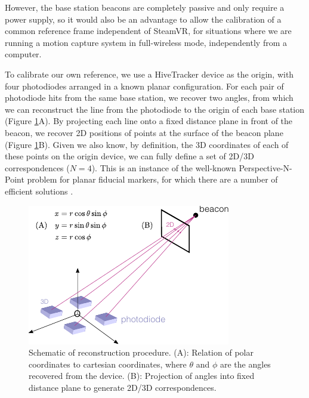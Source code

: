 \documentclass[sigchi]{acmart}
\begin{document}
However, the base station beacons are completely passive and only require a power supply, so it would also be an advantage to allow the calibration of a common reference frame independent of SteamVR, for situations where we are running a motion capture system in full-wireless mode, independently from a computer.

To calibrate our own reference, we use a HiveTracker device as the origin, with four photodiodes arranged in a known planar configuration. For each pair of photodiode hits from the same base station, we recover two angles, from which we can reconstruct the line from the photodiode to the origin of each base station (Figure \ref{Fig:Reconstruction}A). By projecting each line onto a fixed distance plane in front of the beacon, we recover 2D positions of points at the surface of the beacon plane (Figure \ref{Fig:Reconstruction}B). Given we also know, by definition, the 3D coordinates of each of these points on the origin device, we can fully define a set of 2D/3D correspondences ($N = 4$). This is an instance of the well-known Perspective-N-Point problem for planar fiducial markers, for which there are a number of efficient solutions \cite{Lepetit2008,Garrido-Jurado2014}.

\begin{figure}[h]
\centering
\includegraphics[width=1.0\columnwidth]{Figures/reconstruction.pdf}
\caption{Schematic of reconstruction procedure. (A): Relation of polar coordinates to cartesian coordinates, where $\theta$ and $\phi$ are the angles recovered from the device. (B): Projection of angles into fixed distance plane to generate 2D/3D correspondences.}
\label{Fig:Reconstruction}
\end{figure}
\end{document}
